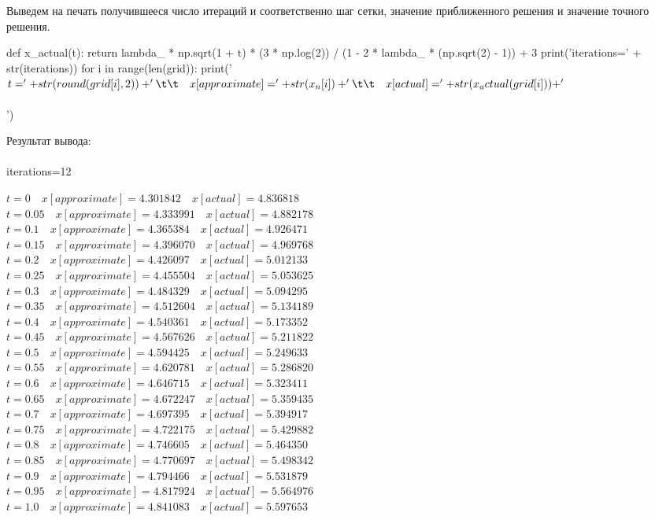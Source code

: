 \documentclass[a4paper, 12pt]{report}
\begin{document}
			Выведем на печать получившееся число итераций и соответственно шаг сетки, значение приближенного решения и значение точного решения.
			\begin{python}
			 def x_actual(t):
					return lambda_ * np.sqrt(1 + t) * (3 * np.log(2)) / (1 - 2 * lambda_ * (np.sqrt(2) - 1)) + 3
				print('iterations=' + str(iterations))
				for i in range(len(grid)):
					print('$t=' + str(round(grid[i], 2)) + '\t\t\quad x[approximate]=' + str(x_n[i]) + '\t\t\quad x[actual]=' + str(x_actual(grid[i])) + '$\\\\')\end{python}
				Результат вывода:\\\\
				iterations=12
				\begin{center}
					$t=0		\quad x[approximate]=4.301842		\quad x[actual]=4.836818$\\
					$t=0.05		\quad x[approximate]=4.333991		\quad x[actual]=4.882178$\\
					$t=0.1		\quad x[approximate]=4.365384		\quad x[actual]=4.926471$\\
					$t=0.15		\quad x[approximate]=4.396070		\quad x[actual]=4.969768$\\
					$t=0.2		\quad x[approximate]=4.426097	\quad x[actual]=5.012133$\\
					$t=0.25		\quad x[approximate]=4.455504	\quad x[actual]=5.053625$\\
					$t=0.3		\quad x[approximate]=4.484329	\quad x[actual]=5.094295$\\
					$t=0.35		\quad x[approximate]=4.512604		\quad x[actual]=5.134189$\\
					$t=0.4		\quad x[approximate]=4.540361		\quad x[actual]=5.173352$\\
					$t=0.45		\quad x[approximate]=4.567626		\quad x[actual]=5.211822$\\
					$t=0.5		\quad x[approximate]=4.594425		\quad x[actual]=5.249633$\\
					$t=0.55		\quad x[approximate]=4.620781		\quad x[actual]=5.286820$\\
					$t=0.6		\quad x[approximate]=4.646715		\quad x[actual]=5.323411$\\
					$t=0.65		\quad x[approximate]=4.672247		\quad x[actual]=5.359435$\\
					$t=0.7		\quad x[approximate]=4.697395		\quad x[actual]=5.394917$\\
					$t=0.75		\quad x[approximate]=4.722175		\quad x[actual]=5.429882$\\
					$t=0.8		\quad x[approximate]=4.746605		\quad x[actual]=5.464350$\\
					$t=0.85		\quad x[approximate]=4.770697		\quad x[actual]=5.498342$\\
					$t=0.9		\quad x[approximate]=4.794466		\quad x[actual]=5.531879$\\
					$t=0.95		\quad x[approximate]=4.817924		\quad x[actual]=5.564976$\\
					$t=1.0		\quad x[approximate]=4.841083		\quad x[actual]=5.597653$
				\end{center}
\end{document}
